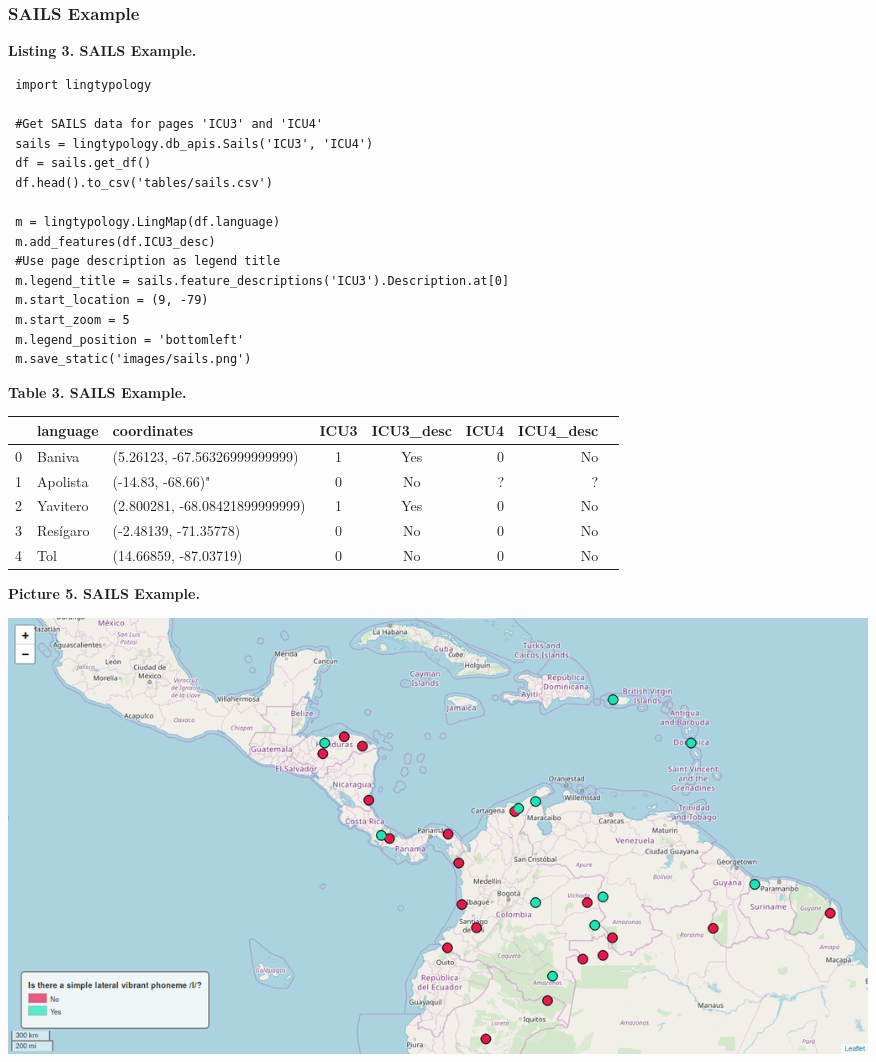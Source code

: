 \documentclass[a4paper,12pt]{article}
\begin{document}
\subsubsection{SAILS Example}

\textbf{Listing 3. SAILS Example.}
\begin{lstlisting}
 import lingtypology
 
 #Get SAILS data for pages 'ICU3' and 'ICU4'
 sails = lingtypology.db_apis.Sails('ICU3', 'ICU4')
 df = sails.get_df()
 df.head().to_csv('tables/sails.csv')
 
 m = lingtypology.LingMap(df.language)
 m.add_features(df.ICU3_desc)
 #Use page description as legend title
 m.legend_title = sails.feature_descriptions('ICU3').Description.at[0]
 m.start_location = (9, -79)
 m.start_zoom = 5
 m.legend_position = 'bottomleft'
 m.save_static('images/sails.png')
\end{lstlisting}

\textbf{Table 3. SAILS Example.}

\begin{adjustbox}{max width=\textwidth}
\begin{tabular}{ l | l | l | c | c | r | r | r }
    ~ & language & coordinates & ICU3 & ICU3\_desc & ICU4 & ICU4\_desc \\
    \hline
    0 & Baniva & (5.26123, -67.56326999999999) & 1 & Yes & 0 & No \\
    1 & Apolista & (-14.83, -68.66)" & 0 & No & ? & ? \\
    2 & Yavitero & (2.800281, -68.08421899999999) & 1 & Yes & 0 & No \\
    3 & Resígaro & (-2.48139, -71.35778) & 0 & No & 0 & No \\
    4 & Tol & (14.66859,  -87.03719) & 0 & No & 0 & No \\
\end{tabular}
\end{adjustbox}

\bigskip

\begin{samepage}
\textbf{Picture 5. SAILS Example.}\nopagebreak

\includegraphics[width=\textwidth]{images/sails.png}
\end{samepage}
\end{document}
